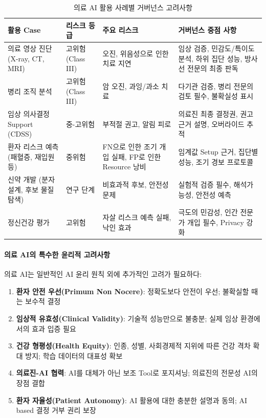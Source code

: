 \begin{table}[htbp]
\centering
\caption{의료 AI 활용 사례별 거버넌스 고려사항}
\label{tab:healthcare_ai_cases}
\begin{tabularx}{\textwidth}{p{2.5cm}p{2.5cm}p{2.5cm}X}
\toprule
\textbf{활용 Case} & \textbf{리스크 등급} & \textbf{주요 리스크} & \textbf{거버넌스 중점 사항} \\
\midrule
의료 영상 진단 (X-ray, CT, MRI) & 
고위험 (Class III) & 
오진, 위음성으로 인한 치료 지연 & 
임상 검증, 민감도/특이도 분석, 하위 집단 성능, 방사선 전문의 최종 판독 \\
\midrule
병리 조직 분석 & 
고위험 (Class III) & 
암 오진, 과잉/과소 치료 & 
다기관 검증, 병리 전문의 검토 필수, 불확실성 표시 \\
\midrule
임상 의사결정 Support (CDSS) & 
중-고위험 & 
부적절 권고, 알림 피로 & 
의료진 최종 결정권, 권고 근거 설명, 오버라이드 추적 \\
\midrule
환자 리스크 예측 (패혈증, 재입원 등) & 
중위험 & 
FN으로 인한 조기 개입 실패, FP로 인한 Resource 낭비 & 
임계값 Setup 근거, 집단별 성능, 조기 경보 프로토콜 \\
\midrule
신약 개발 (분자 설계, 후보 물질 탐색) & 
연구 단계 & 
비효과적 후보, 안전성 문제 & 
실험적 검증 필수, 해석가능성, 안전성 예측 \\
\midrule
정신건강 평가 & 
고위험 & 
자살 리스크 예측 실패, 낙인 효과 & 
극도의 민감성, 인간 전문가 개입 필수, Privacy 강화 \\
\bottomrule
\end{tabularx}
\end{table}


\paragraph{의료 AI의 특수한 윤리적 고려사항}

의료 AI는 일반적인 AI 윤리 원칙 외에 추가적인 고려가 필요하다:

\begin{enumerate}
 \item \textbf{환자 안전 우선(Primum Non Nocere)}: 
 정확도보다 안전이 우선; 불확실할 때는 보수적 결정
 
 \item \textbf{임상적 유효성(Clinical Validity)}: 
 기술적 성능만으로 불충분; 실제 임상 환경에서의 효과 입증 필요
 
 \item \textbf{건강 형평성(Health Equity)}: 
 인종, 성별, 사회경제적 지위에 따른 건강 격차 확대 방지; 
 학습 데이터의 대표성 확보
 
 \item \textbf{의료진-AI 협력}: 
 AI를 대체가 아닌 보조 Tool로 포지셔닝; 
 의료진의 전문성 AI의 장점 결합
 
 \item \textbf{환자 자율성(Patient Autonomy)}: 
 AI 활용에 대한 충분한 설명과 동의; 
 AI based 결정 거부 권리 보장
\end{enumerate}



